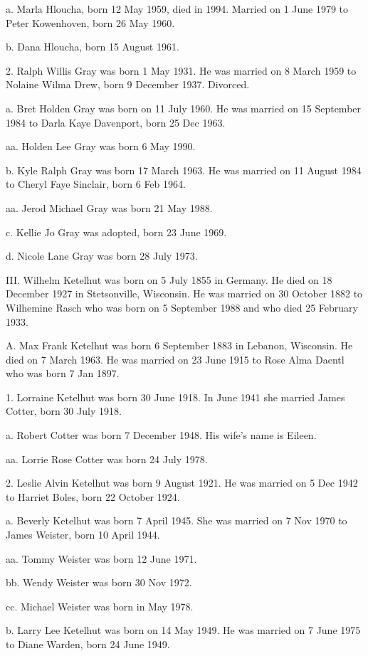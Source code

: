 \documentclass[a4paper]{article}
\begin{document}
a. Marla Hloucha, born 12 May 1959, died in 1994.  Married  on 1 June 1979 to Peter Kowenhoven, born 26 May 1960.

b. Dana Hloucha, born 15 August 1961.

2. Ralph Willis Gray was born 1 May 1931.  He was married on 8 March 1959 to Nolaine Wilma Drew, born 9 December 1937.  Divorced.

a. Bret Holden Gray was born on 11 July 1960.  He was married on 15 September  1984 to Darla Kaye Davenport, born 25 Dec 1963.

aa. Holden Lee Gray was born 6 May 1990.

b. Kyle Ralph Gray was born 17 March 1963.  He was married on 11 August 1984 to Cheryl Faye Sinclair, born 6 Feb 1964.

aa. Jerod Michael Gray was born 21 May 1988.

c. Kellie Jo Gray was adopted, born 23 June 1969.

d. Nicole Lane Gray was born 28 July 1973.

III. Wilhelm Ketelhut was born on 5 July 1855 in Germany.  He died on 18 December 1927 in Stetsonville, Wisconsin.  He was married on 30 October 1882 to Wilhemine Rasch who was born on 5 September 1988 and who died 25 February 1933.   

A. Max Frank Ketelhut was born 6 September 1883 in Lebanon, Wisconsin.  He died on 7 March 1963.  He was married on 23 June 1915 to Rose Alma Daentl who was born 7 Jan 1897.  

1. Lorraine Ketelhut was born 30 June 1918.  In June 1941 she married James Cotter, born 30 July 1918.  

a. Robert  Cotter was born 7 December 1948.  His wife's name is Eileen.

aa. Lorrie Rose Cotter was born 24 July 1978.

2. Leslie Alvin Ketelhut was born 9 August 1921.  He was married on 5 Dec 1942 to Harriet Boles, born 22 October 1924.

a. Beverly Ketelhut was born 7 April 1945.  She was married on 7 Nov 1970 to James Weister, born 10 April 1944.

aa. Tommy Weister was born 12 June 1971.

bb. Wendy Weister was born 30 Nov 1972.

cc.  Michael Weister was born in May 1978.

b. Larry Lee Ketelhut was born on 14 May 1949.  He was married on 7 June 1975 to Diane Warden, born 24 June 1949.
\end{document}

